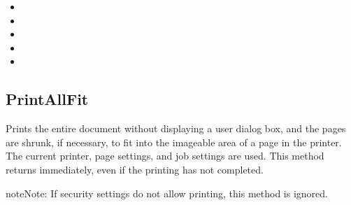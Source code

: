 \documentclass[letterpaper,12pt,english,openany,oneside]{sphinxmanual}
\begin{document}
\begin{sphinxVerbatim}[commandchars=\\\{\}]
 
\end{sphinxVerbatim}
\label{\detokenize{IAC_API_OLE_Objects:related-methods-141}}
\begin{itemize}
\item {} 
 

\item {} 
 

\item {} 
 

\item {} 
 

\item {} 
 

\end{itemize}




\subsection{PrintAllFit}
\label{\detokenize{IAC_API_OLE_Objects:printallfit}}
Prints the entire document without displaying a user dialog box, and the pages are shrunk, if necessary, to fit into the imageable area of a page in the printer. The current printer, page settings, and job settings are used. This method returns immediately, even if the printing has not completed.

\begin{sphinxadmonition}{note}{Note:}
If security settings do not allow printing, this method is ignored.
\end{sphinxadmonition}


\begin{sphinxVerbatim}[commandchars=\\\{\}]
  
\end{sphinxVerbatim}
\label{\detokenize{IAC_API_OLE_Objects:parameters-81}}
\end{document}
